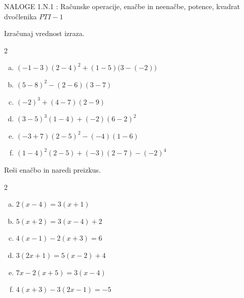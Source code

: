 \documentclass[a4paper,12pt]{letter}
\renewcommand{\headrulewidth}{3pt}
\renewcommand{\headrulewidth}{0.3pt}
\begin{document}
\pagestyle{fancy}
\renewcommand\headrulewidth{0pt}
\lhead{}\chead{}\rhead{}
\rfoot{\vspace*{-2\baselineskip}}
\renewcommand{\vec}{\overrightarrow}
\everymath{\displaystyle}

\begin{minipage}{20cm}
\begin{bclogo}[couleur=brown!40,
  arrondi=0,ombre=true, couleurOmbre=gray!50,
logo =\bcplume,
  noborder=true]
{\textrm{{\Large{NALOGE 1.N.1} \Huge{}:
\large{Ra\v{c}unske operacije, ena\v{c}be in neena\v{c}be, potence, kvadrat dvo\v{c}lenika} \hfill $PTI-1$}}}
\end{bclogo}
\end{minipage}
\begin{minipage}{20cm}
\end{minipage}


\begin{naloga}
Izra\v{c}unaj vrednost izraza.

\begin{multicols}{2}
\begin{enumerate}[a.)]
\item $(-1-3)(2-4)^2+(1-5)\big(3-(-2)\big)$
\item $(5-8)^2-(2-6)(3-7)$
\item $(-2)^3+(4-7)(2-9)$
\item $(3-5)^3(1-4)+(-2)(6-2)^2$
\item $(-3+7)(2-5)^2-(-4)(1-6)$
\item $(1-4)^2(2-5)+(-3)(2-7)-(-2)^4$
\end{enumerate}
\end{multicols}
\end{naloga}

\begin{naloga}
Re\v{s}i ena\v{c}bo in naredi preizkus.

\begin{multicols}{2}
\begin{enumerate}[a.)]
\item $2(x-4)=3(x+1)$
\item $5(x+2)=3(x-4)+2$
\item $4(x-1)-2(x+3)=6$
\item $3(2x+1)=5(x-2)+4$
\item $7x-2(x+5)=3(x-4)$
\item $4(x+3)-3(2x-1)=-5$
\end{enumerate}
\end{multicols}
\end{naloga}
\end{document}
